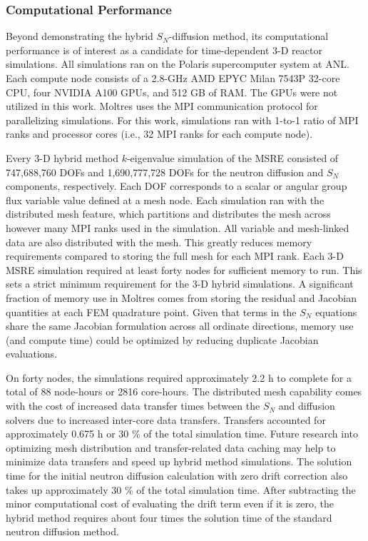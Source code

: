 \subsubsection{Computational Performance}

Beyond demonstrating the hybrid $S_N$-diffusion method, its computational performance is of
interest as a candidate for time-dependent 3-D reactor simulations. All simulations ran on the
Polaris supercomputer system at \gls{ANL}. Each compute node consists of a 2.8-GHz AMD EPYC Milan
7543P 32-core CPU, four NVIDIA A100 GPUs, and 512 GB of RAM. The GPUs were not utilized in this
work. Moltres uses the \gls{MPI} communication protocol for parallelizing simulations. For this
work, simulations ran with 1-to-1 ratio of \gls{MPI} ranks and processor cores (i.e., 32 \gls{MPI}
ranks for each compute node).

Every 3-D hybrid method $k$-eigenvalue
simulation of the \gls{MSRE} consisted of 747,688,760 \glspl{DOF} and 1,690,777,728 \glspl{DOF} for
the neutron diffusion and $S_N$ components, respectively. Each \gls{DOF} corresponds to a scalar
or angular group flux variable value defined at a mesh node. Each simulation ran with the distributed
mesh feature, which partitions and distributes the mesh across however many \gls{MPI} ranks used
in the simulation. All variable and mesh-linked data are also distributed with the mesh. This
greatly reduces memory requirements compared to storing the full mesh for each \gls{MPI} rank.
Each 3-D \gls{MSRE} simulation required at least forty nodes for sufficient memory to run. This
sets a strict minimum requirement for the 3-D hybrid simulations. A significant fraction of
memory use in Moltres comes from storing the residual and Jacobian quantities at each \gls{FEM}
quadrature point. Given that terms in the $S_N$ equations share the same Jacobian formulation
across all ordinate directions, memory use (and compute time) could be optimized by reducing
duplicate Jacobian evaluations.

On forty nodes, the simulations
required approximately 2.2 h to complete for a total of 88 node-hours or 2816 core-hours. The
distributed mesh capability comes with the cost of increased data transfer times between the $S_N$
and diffusion solvers due to increased inter-core data transfers. Transfers accounted for
approximately 0.675 h or 30 \% of the total simulation time. Future research into optimizing mesh
distribution and transfer-related data caching may help to minimize data transfers and speed up
hybrid method simulations. The solution time for the initial neutron diffusion calculation with zero
drift correction also takes up approximately 30 \% of the total simulation time. After subtracting
the minor computational cost of evaluating the drift term even if it is zero, the hybrid method
requires about four times the solution time of the standard neutron diffusion method.

